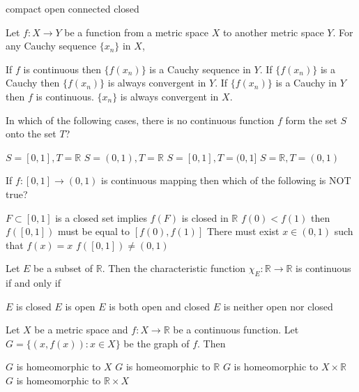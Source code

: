\documentclass[10pt]{exam}
\begin{document}
\begin{questions}
\begin{oneparchoices}
\choice compact
\choice open 
\choice connected 
\choice closed 
\end{oneparchoices}

\question 
Let $f:X \rightarrow Y$ be a function from a metric space $X$ to another metric space $Y$. For any Cauchy sequence $\{x_n\}$ in $X$, 

\begin{choices}
\choice If $f$ is continuous then $\{f(x_n)\}$ is a Cauchy sequence in $Y$.
\choice If $\{f(x_n)\}$ is a Cauchy then $\{f(x_n)\}$  is always convergent in  $Y$.
\choice If $\{f(x_n)\}$ is a Cauchy  in $Y$ then $f$ is continuous.
\choice $\{x_n\}$ is always convergent in $X$.
\end{choices}

\question
In which of the following cases, there is no continuous function $f$ form the set $S$ onto the set $T$?

\begin{choices}
\choice $S=[0,1],T=\mathbb{R}$
\choice $S=(0,1),T=\mathbb{R}$
\choice $S=[0,1],T=(0,1]$
\choice $S=\mathbb{R},T=(0,1)$
\end{choices}

\question
If $f:[0,1] \rightarrow (0,1)$ is continuous mapping then which of the following is NOT true?

\begin{choices}
\choice $F \subset [0,1]$ is a closed set implies $f(F)$ is closed in $\mathbb{R}$
\choice $f(0)<f(1)$ then $f([0,1])$ must be equal to $[f(0),f(1)]$
\choice There must exist $x \in (0,1)$ such that $f(x)=x$
\choice $f([0,1]) \neq (0,1)$
\end{choices}

\question 
Let $E$ be a subset of $\mathbb{R}$. Then the characteristic function $ \chi_E : \mathbb{R} \rightarrow \mathbb{R}$ is continuous if and only if 

\begin{checkboxes}
\choice $E$ is closed 
\choice $E$ is open 
\choice $E$ is both open and closed 
\choice $E$ is neither open nor closed 
\end{checkboxes}

\question
Let $X$ be a metric space and $f:X \rightarrow \mathbb{R}$ be a continuous function. Let $G = \{(x, f(x)):x \in X \} $ be the graph of $f$. Then 

\begin{checkboxes}
\choice $G$ is homeomorphic to $X$  
\choice $G$ is homeomorphic to $\mathbb{R}$  
\choice $G$ is homeomorphic to $X \times \mathbb{R}$  
\choice $G$ is homeomorphic to $\mathbb{R} \times X$
\end{checkboxes}  


\end{questions}
\end{document}
